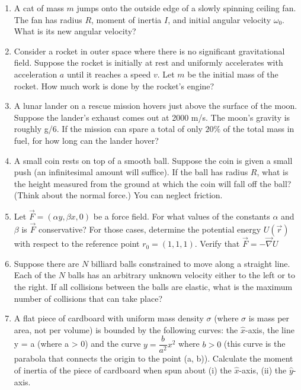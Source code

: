 \documentclass[fleqn]{article}
\begin{document}
\begin{enumerate}
    \item A cat of mass $m$ jumps onto the outside edge of a slowly spinning ceiling fan. The fan has radius $R$, moment of inertia $I$, and initial
    angular velocity $\omega_0$. What is its new angular velocity?
    


    \item Consider a rocket in outer space where there is no significant gravitational field. Suppose the rocket is initially at rest and uniformly
    accelerates with acceleration $a$ until it reaches a speed $v$. Let $m$ be the initial mass of the rocket. How much work is done by the rocket’s
    engine?
    


    \item A lunar lander on a rescue mission hovers just above the surface of
    the moon. Suppose the lander’s exhaust comes out at 2000 m/s. The
    moon’s gravity is roughly g/6. If the mission can spare a total of only $20\%$ of the total mass in fuel, for how long can the lander hover?
    



    \item A small coin rests on top of a smooth ball. Suppose the coin is given a
    small push (an infinitesimal amount will suffice). If the ball has radius $R$, what is the height measured from the ground at which the coin will
    fall off the ball? (Think about the normal force.) You can neglect
    friction.



    \item  Let $\overrightarrow{F}= (\alpha y, \beta x, 0)$ be a force field. For what values of the constants
    $\alpha$ and $\beta$ is $\overrightarrow{F}$ conservative? For those cases, determine the potential energy $U(\overrightarrow{r})$
    with respect to the reference point $r_0=(1,1,1)$. Verify that $\overrightarrow{F}=-\overrightarrow{\nabla} U$



    \item Suppose there are $N$ billiard balls constrained to move along a straight
    line. Each of the $N$ balls has an arbitrary unknown velocity either to
    the left or to the right. If all collisions between the balls are elastic,
    what is the maximum number of collisions that can take place?
    


    \item A flat piece of cardboard with uniform mass density $\sigma$ (where $\sigma$ is mass
    per area, not per volume) is bounded by the following curves: the $\hat{x}$-axis, the line y = a (where a > 0) and the curve $y=\dfrac{b}{a^2}x^2$ 
    where $b>0$ (this curve is the parabola that connects the origin to the point (a, b)).
    Calculate the moment of inertia of the piece of cardboard when spun
    about (i) the $\hat{x}$-axis, (ii) the $\hat{y}$-axis.




\end{enumerate}
\end{document}
